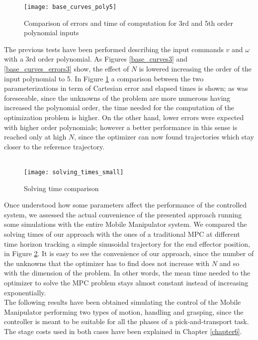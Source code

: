 \begin{figure}[h!]
\centering
\texttt{[image: base\_curves\_poly5]}
\caption{Comparison of errors and time of computation for 3rd and 5th order polynomial inputs}
\label{base_curves_poly5}
\end{figure}
The previous tests have been performed describing the input commands $v$ and $\omega$ with a 3rd order polynomial. As Figures \ref{base_curves3} and \ref{base_curves_errors3} show, the effect of $N$ is lowered increasing the order of the input polynomial to 5. In Figure \ref{base_curves_poly5} a comparison between the two parameterizations in term of Cartesian error and elapsed times is shown; as was foreseeable, since the unknowns of the problem are more numerous having increased the polynomial order, the time needed for the computation of the optimization problem is higher. On the other hand, lower errors were expected with higher order polynomials; however a better performance in this sense is reached only at high $N$, since the optimizer can now found trajectories which stay closer to the reference trajectory.
\\\\
\begin{figure}[h!]
\centering
\texttt{[image: solving\_times\_small]}
\caption{Solving time comparison}
\label{solving_times}
\end{figure}
Once understood how some parameters affect the performance of the controlled system, we assessed the actual convenience of the presented approach running some simulations with the entire Mobile Manipulator system. We compared the solving times of our approach with the ones of a traditional MPC at different time horizon tracking a simple sinusoidal trajectory for the end effector position, in Figure \ref{solving_times}. It is easy to see the convenience of our approach, since the number of the unknowns that the optimizer has to find does not increase with $N$ and so with the dimension of the problem. In other words, the mean time needed to the optimizer to solve the MPC problem stays almost constant instead of increasing exponentially.\\
The following results have been obtained simulating the control of the Mobile Manipulator performing two types of motion, handling and grasping, since the controller is meant to be suitable for all the phases of a pick-and-transport task. The stage costs used in both cases have been explained in Chapter \ref{chapter6}.

